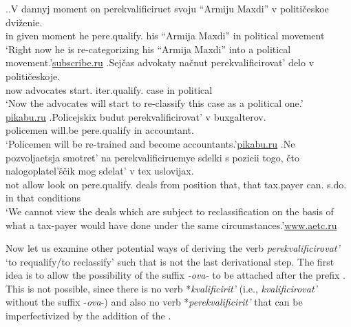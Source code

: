 \ex.\label{ex:qualify}\ag.\label{ex:qualify1}V dannyj moment on perekvalificiruet\textsuperscript{\IPF} svoju {``Armiju Maxdi''} v politi\v{c}eskoe dvi\v{z}enie.\\
in given moment he pere.qualify. his {``Armija Maxdi''} in political movement\\
\trans `Right now he is re-categorizing his ``Armija Maxdi'' into a political movement.'\hbox{}\hfill\hbox{\url{subscribe.ru}}
\bg.\label{ex:qualify2}Sej\v{c}as advokaty na\v{c}nut perekvalificirovat'\textsuperscript{\IPF} delo v politi\v{c}eskoje.\\
now advocates start. iter.qualify. case in political\\
\trans `Now the advocates will start to re-classify this case as a political one.'\\\hbox{}\hfill\hbox{\url{pikabu.ru}}
\bg.\label{ex:qualify3}Policejskix budut perekvalificirovat'\textsuperscript{\IPF} v buxgalterov.\\	
policemen will.be pere.qualify in accountant.\\
\trans `Policemen will be re-trained and become accountants.'\hbox{}\hfill\hbox{\url{pikabu.ru}}
\bg.\label{ex:qualify4}Ne pozvoljaetsja smotret’ na perekvalificiruemye sdelki s pozicii togo, \v{c}to nalogoplatel’\v{s}\v{c}ik mog sdelat’ v tex uslovijax.\\
not allow look on pere.qualify. deals from position that, that tax.payer can. s.do. in that conditions\\
\trans `We cannot view the deals which are subject to reclassification on the basis of what a tax-payer would have done under the same circumstances.'\hbox{}\hfill\hbox{\url{www.aetc.ru}}

Now let us examine other potential ways of deriving the verb \textit{perekvalificirovat'} `to requalify/to reclassify' such that  is not the last derivational step. The first idea is to allow the possibility of the suffix \textit{-ova-} to be attached after the prefix . This is not possible, since there is no verb *\textit{kvalificirit'} (i.e., \textit{kvalificirovat'} without the suffix -\textit{ova}-) and also no verb  *\textit{perekvalificirit'} that can be imperfectivized by the addition of the .

